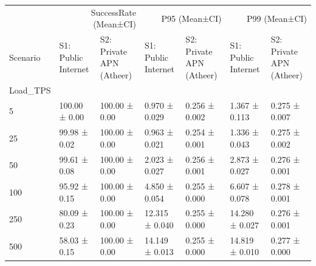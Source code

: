 \begin{tabular}{lllllll}
\toprule
 & \multicolumn{2}{r}{SuccessRate (Mean±CI)} & \multicolumn{2}{r}{P95 (Mean±CI)} & \multicolumn{2}{r}{P99 (Mean±CI)} \\
Scenario & S1: Public Internet & S2: Private APN (Atheer) & S1: Public Internet & S2: Private APN (Atheer) & S1: Public Internet & S2: Private APN (Atheer) \\
Load_TPS &  &  &  &  &  &  \\
\midrule
5 & 100.00 ± 0.00 & 100.00 ± 0.00 & 0.970 ± 0.029 & 0.256 ± 0.002 & 1.367 ± 0.113 & 0.275 ± 0.007 \\
25 & 99.98 ± 0.02 & 100.00 ± 0.00 & 0.963 ± 0.021 & 0.254 ± 0.001 & 1.336 ± 0.043 & 0.275 ± 0.002 \\
50 & 99.61 ± 0.08 & 100.00 ± 0.00 & 2.023 ± 0.027 & 0.256 ± 0.001 & 2.873 ± 0.027 & 0.276 ± 0.001 \\
100 & 95.92 ± 0.15 & 100.00 ± 0.00 & 4.850 ± 0.054 & 0.255 ± 0.000 & 6.607 ± 0.078 & 0.278 ± 0.001 \\
250 & 80.09 ± 0.23 & 100.00 ± 0.00 & 12.315 ± 0.040 & 0.255 ± 0.000 & 14.280 ± 0.027 & 0.276 ± 0.001 \\
500 & 58.03 ± 0.15 & 100.00 ± 0.00 & 14.149 ± 0.013 & 0.255 ± 0.000 & 14.819 ± 0.010 & 0.277 ± 0.000 \\
\bottomrule
\end{tabular}
